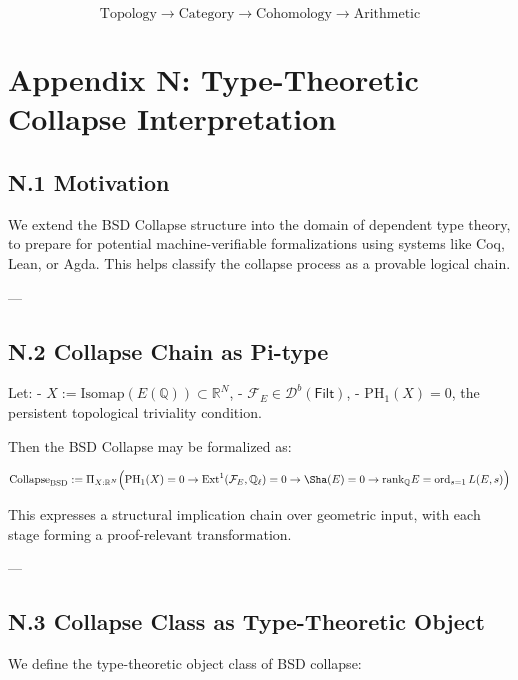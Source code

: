 \[
\boxed{
\text{Topology} \to \text{Category} \to \text{Cohomology} \to \text{Arithmetic}
}
\]



\section*{Appendix N: Type-Theoretic Collapse Interpretation}

\subsection*{N.1 Motivation}

We extend the BSD Collapse structure into the domain of dependent type theory,  
to prepare for potential machine-verifiable formalizations using systems like Coq, Lean, or Agda.  
This helps classify the collapse process as a provable logical chain.

---

\subsection*{N.2 Collapse Chain as Pi-type}

Let:
- \( X := \mathrm{Isomap}(E(\mathbb{Q})) \subset \mathbb{R}^N \),
- \( \mathcal{F}_E \in \mathcal{D}^b(\mathsf{Filt}) \),
- \( \mathrm{PH}_1(X) = 0 \), the persistent topological triviality condition.

Then the BSD Collapse may be formalized as:

\[
\mathrm{Collapse}_{\mathrm{BSD}} := 
\Pi_{X : \mathbb{R}^N} \Big(
\mathrm{PH}_1(X) = 0 \to 
\mathrm{Ext}^1(\mathcal{F}_E, \mathbb{Q}_\ell) = 0 \to 
\Sha(E) = 0 \to 
\mathrm{rank}_\mathbb{Q} E = \operatorname{ord}_{s=1} L(E,s)
\Big)
\]

This expresses a structural implication chain over geometric input,  
with each stage forming a proof-relevant transformation.

---

\subsection*{N.3 Collapse Class as Type-Theoretic Object}

We define the type-theoretic object class of BSD collapse:


